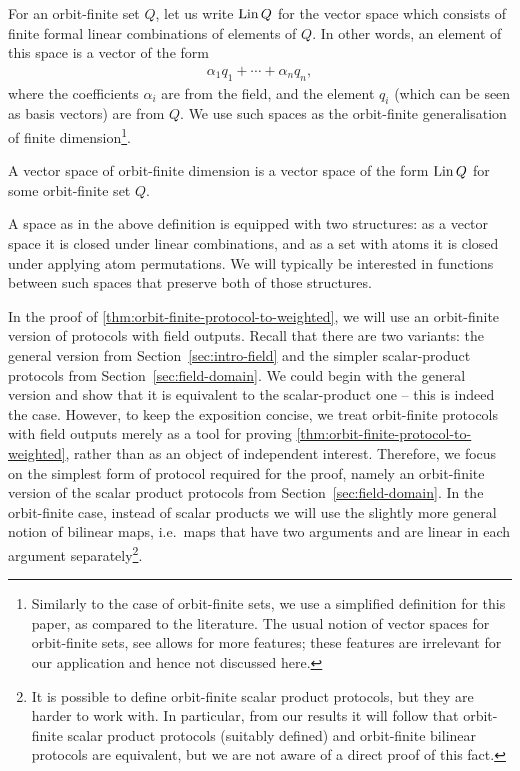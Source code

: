 For an orbit-finite set $Q$, let us write $\operatorname{Lin} Q$ for the vector space which consists of finite formal linear combinations of elements of $Q$. In other words, an element of this space is a vector of the form 
\begin{align*}
\alpha_1 q_1 + \cdots + \alpha_n q_n,
\end{align*}
where the coefficients $\alpha_i$ are from the field, and the element $q_i$ (which can be seen as basis vectors) are from $Q$. We use such spaces as the orbit-finite generalisation of finite dimension\footnote{Similarly to the case of orbit-finite sets, we use a simplified definition for this paper, as compared to the literature. The usual notion of vector spaces for orbit-finite sets, see \cite[Definition 8.1]{bojanczyk_slightly} allows for more features; these features are irrelevant for our application and hence not discussed here.}.

\begin{definition}
    \label{def:orbit-finite-vector-space} A vector space of orbit-finite dimension is a vector space of the form $\operatorname{Lin} Q$ for some orbit-finite set $Q$.
\end{definition}
A space as in the above definition is equipped with two structures: as a vector space it is closed under linear combinations, and as a set with atoms it is closed under applying atom permutations.
We will typically be interested in functions between such spaces that preserve both of those structures.

In the proof of \cref{thm:orbit-finite-protocol-to-weighted}, we will use an orbit-finite version of protocols with field outputs. 
Recall that there are two variants: the general version from Section~\ref{sec:intro-field} and the simpler scalar-product protocols 
from Section~\ref{sec:field-domain}. We could begin with the general version and show that it is equivalent to the scalar-product one --
this is indeed the case. However, to keep the exposition concise, we treat orbit-finite protocols with field outputs merely as a tool 
for proving \cref{thm:orbit-finite-protocol-to-weighted}, rather than as an object of independent interest. Therefore, we focus on the 
simplest form of protocol required for the proof, namely an orbit-finite version of the scalar product protocols from Section~\ref{sec:field-domain}. In the orbit-finite case, instead of scalar products we will use the slightly more general notion of bilinear maps, i.e.~maps that have two arguments and are linear in each argument separately\footnote{
    It is possible to define orbit-finite scalar product protocols,
    but they are harder to work with. In particular, from our results it will follow that orbit-finite scalar product protocols (suitably defined) and orbit-finite bilinear protocols are equivalent, but we are not aware of a direct proof of this fact.
}. 

